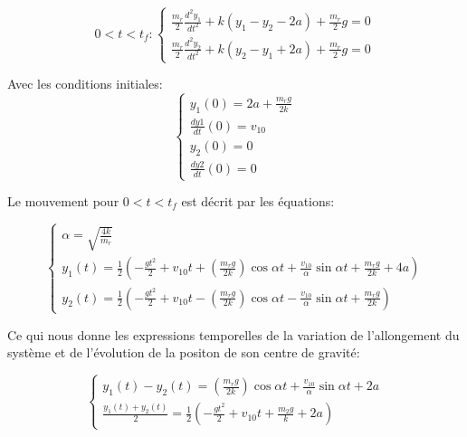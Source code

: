\begin{equation}
   0<t<t_f: 
  \begin{cases}
    \frac{m_r}{2}\frac{d^2y_1}{dt^2}+k(y_1-y_2-2a)+\frac{m_r}{2}g=0\\
    \frac{m_r}{2}\frac{d^2y_2}{dt^2}+k(y_2-y_1+2a)+\frac{m_r}{2}g=0
  \end{cases}
  \label{eq:3}
\end{equation}

Avec les conditions initiales: 
\begin{equation}
  \begin{cases}
    y_1(0)=2a+\frac{m_r g}{2k}\\
    \frac{d y1}{dt}(0)=v_{10}\\
    y_2(0)=0 \\
    \frac{d y2}{dt}(0)=0
  \end{cases}
  \label{eq:4}
\end{equation}

Le mouvement pour $0<t<t_f$ est décrit par les équations:

\begin{equation}
  \begin{cases}
    \alpha=\sqrt{\frac{4k}{m_r}}\\
    y_1(t)=\frac{1}{2}(-\frac{g t^2}{2}+v_{10}t+(\frac{m_r g}{2k})\cos{\alpha t}+\frac{v_{10}}{\alpha}\sin{\alpha t}+\frac{m_r g}{2k}+4a) \\
    y_2(t)=\frac{1}{2}(-\frac{g t^2}{2}+v_{10}t-(\frac{m_r g}{2k})\cos{\alpha t}-\frac{v_{10}}{\alpha}\sin{\alpha t}+\frac{m_r g}{2k}) 
  \end{cases}
  \label{eq:5}
\end{equation}

Ce qui nous donne les expressions temporelles de la variation de l'allongement du système et de l'évolution de la positon de son centre de gravité:

\begin{equation}
  \begin{cases}
    y_1(t)-y_2(t)= (\frac{m_r g}{2k})\cos{\alpha t}+\frac{v_{10}}{\alpha}\sin{\alpha t}+2a\\
    \frac{y_1(t)+y_2(t)}{2}=\frac{1}{2}(-\frac{g t^2}{2}+v_{10}t+\frac{m_2 g}{k} +2a)
  \end{cases}
  \label{eq:6}
\end{equation}

